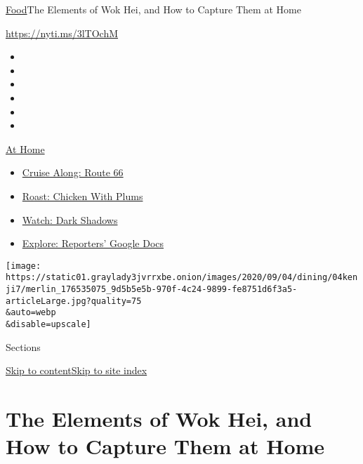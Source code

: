 \href{/section/food}{Food}\textbar{}The Elements of Wok Hei, and How to
Capture Them at Home

\url{https://nyti.ms/3lTOchM}

\begin{itemize}
\item
\item
\item
\item
\item
\item
\end{itemize}

\href{https://www.nytimes3xbfgragh.onion/spotlight/at-home?action=click\&pgtype=Article\&state=default\&region=TOP_BANNER\&context=at_home_menu}{At
Home}

\begin{itemize}
\tightlist
\item
  \href{https://www.nytimes3xbfgragh.onion/2020/09/07/travel/route-66.html?action=click\&pgtype=Article\&state=default\&region=TOP_BANNER\&context=at_home_menu}{Cruise
  Along: Route 66}
\item
  \href{https://www.nytimes3xbfgragh.onion/2020/09/04/dining/sheet-pan-chicken.html?action=click\&pgtype=Article\&state=default\&region=TOP_BANNER\&context=at_home_menu}{Roast:
  Chicken With Plums}
\item
  \href{https://www.nytimes3xbfgragh.onion/2020/09/04/arts/television/dark-shadows-stream.html?action=click\&pgtype=Article\&state=default\&region=TOP_BANNER\&context=at_home_menu}{Watch:
  Dark Shadows}
\item
  \href{https://www.nytimes3xbfgragh.onion/interactive/2020/at-home/even-more-reporters-editors-diaries-lists-recommendations.html?action=click\&pgtype=Article\&state=default\&region=TOP_BANNER\&context=at_home_menu}{Explore:
  Reporters' Google Docs}
\end{itemize}

\texttt{[image: https://static01.graylady3jvrrxbe.onion/images/2020/09/04/dining/04kenji7/merlin\_176535075\_9d5b5e5b-970f-4c24-9899-fe8751d6f3a5-articleLarge.jpg?quality=75\\\&auto=webp\\\&disable=upscale]}

Sections

\protect\hyperlink{site-content}{Skip to
content}\protect\hyperlink{site-index}{Skip to site index}

\hypertarget{the-elements-of-wok-hei-and-how-to-capture-them-at-home}{%
\section{The Elements of Wok Hei, and How to Capture Them at
Home}\label{the-elements-of-wok-hei-and-how-to-capture-them-at-home}}

